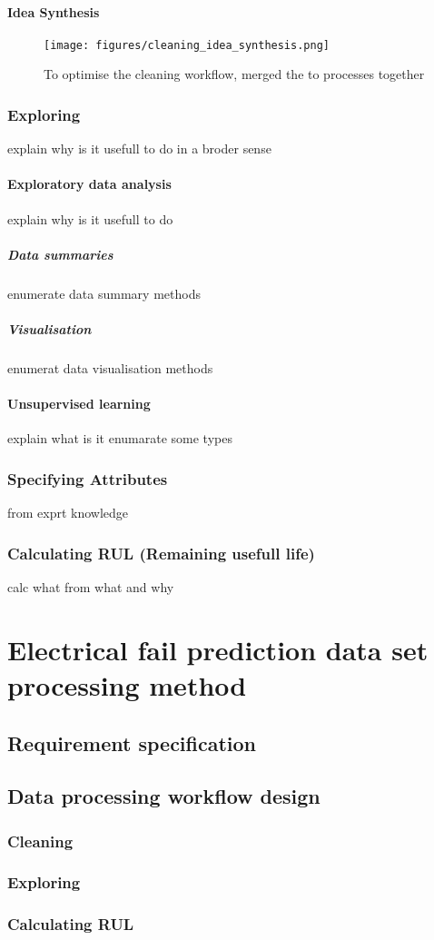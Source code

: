 		\paragraph{Idea Synthesis}
\begin{figure}[!ht]
\centering
\texttt{[image: figures/cleaning\_idea\_synthesis.png]}
\caption{To optimise the cleaning workflow, merged the to processes together} 
\end{figure}
	\subsubsection{Exploring}
	explain why is it usefull to do in a broder sense
		\paragraph{Exploratory data analysis}
			explain why is it usefull to do
			\subparagraph{Data summaries}
			enumerate data summary methods
			\subparagraph{Visualisation}
			enumerat data visualisation methods
		\paragraph{Unsupervised learning}
		explain what is it 
		enumarate some types
	\subsubsection{Specifying Attributes}
	from exprt knowledge
	\subsubsection{Calculating RUL (Remaining usefull life)}
	calc what from what and why
\section{Electrical fail prediction data set processing method}
	\subsection{Requirement specification}
	\subsection{Data processing workflow design}
		\subsubsection{Cleaning}
		\subsubsection{Exploring}
		\subsubsection{Calculating RUL}